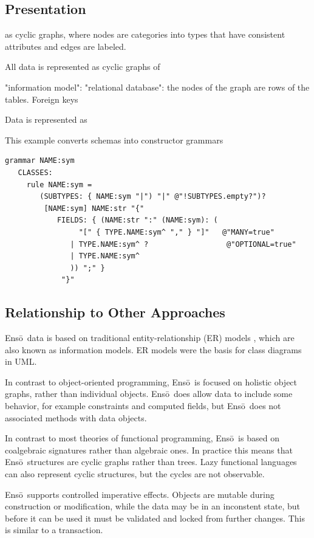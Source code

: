 \documentclass[11pt]{article}
\newcommand{\Enso}{Ens\={o}}
\begin{document}
\subsection{Presentation}






as cyclic graphs, where
nodes are categories into types that have 
consistent attributes and edges are labeled.

All data is represented as cyclic graphs of 


"information model": 
"relational database": the nodes of the graph are
rows of the tables. Foreign keys 

Data is represented as 



This example converts schemas into constructor grammars
\begin{verbatim}
grammar NAME:sym
   CLASSES:
     rule NAME:sym = 
        (SUBTYPES: { NAME:sym "|") "|" @"!SUBTYPES.empty?")?
         [NAME:sym] NAME:str "{" 
            FIELDS: { (NAME:str ":" (NAME:sym): (
                 "[" { TYPE.NAME:sym^ "," } "]"   @"MANY=true"
               | TYPE.NAME:sym^ ?                  @"OPTIONAL=true"
               | TYPE.NAME:sym^
               )) ";" }
             "}"
\end{verbatim}

\subsection{Relationship to Other Approaches}
\label{relatedwork}

\Enso\ data is based on traditional 
entity-relationship (ER) models \cite{FOO},
which are also known as information models. 
ER models were the basis for class diagrams in UML.

In contrast to
object-oriented programming, \Enso\ is focused on holistic
object graphs, rather than individual objects. \Enso\ 
does allow data to include some behavior, for example constraints
and computed fields, but \Enso\ does not associated methods
with data objects.

In contrast to
most theories of functional programming, \Enso\ is based on
coalgebraic signatures rather than algebraic ones. In practice
this means that \Enso\ structures are cyclic graphs rather than
trees. Lazy functional languages can also represent cyclic 
structures, but the cycles are not observable.

\Enso\ supports controlled imperative effects. Objects are
mutable during construction or modification, while the data may be in an
inconstent state, but before it can be used it must be validated
and locked from further changes. This is similar to a transaction.
\end{document}

